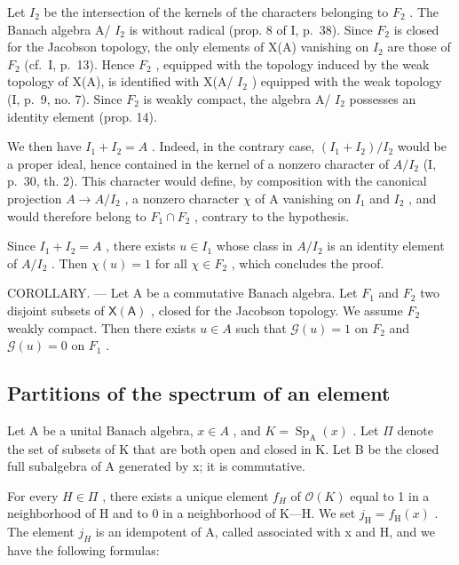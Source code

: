 Let \(I_{2}\) be the intersection of the kernels of the characters belonging to \(F_{2}\) . The Banach algebra A/ \(I_{2}\) is without radical (prop. 8 of I, p.~38). Since \(F_{2}\) is closed for the Jacobson topology, the only elements of X(A) vanishing on \(I_{2}\) are those of \(F_{2}\) (cf.~I, p.~13). Hence \(F_{2}\) , equipped with the topology induced by the weak topology of X(A), is identified with X(A/ \(I_{2}\) ) equipped with the weak topology (I, p.~9, no. 7). Since \(F_{2}\) is weakly compact, the algebra A/ \(I_{2}\) possesses an identity element (prop. 14).

We then have \(I_{1} + I_{2} = A\) . Indeed, in the contrary case, \((I_{1} + I_{2})/I_{2}\) would be a proper ideal, hence contained in the kernel of a nonzero character of \(A/I_{2}\) (I, p.~30, th. 2). This character would define, by composition with the canonical projection \(A \rightarrow A/I_{2}\) , a nonzero character \(\chi\) of A vanishing on \(I_{1}\) and \(I_{2}\) , and would therefore belong to \(F_{1} \cap F_{2}\) , contrary to the hypothesis.

Since \(I_{1} + I_{2} = A\) , there exists \(u \in I_{1}\) whose class in \(A/I_{2}\) is an identity element of \(A/I_{2}\) . Then \(\chi(u) = 1\) for all \(\chi \in F_{2}\) , which concludes the proof.

COROLLARY. --- Let A be a commutative Banach algebra. Let \(F_{1}\) and \(F_{2}\) two disjoint subsets of \(\mathsf{X}(\mathsf{A})\) , closed for the Jacobson topology. We assume \(F_{2}\) weakly compact. Then there exists \(u \in A\) such that \(\mathcal{G}(u) = 1\) on \(F_{2}\) and \(\mathcal{G}(u) = 0\) on \(F_{1}\) .

\subsection{Partitions of the spectrum of an element}

Let A be a unital Banach algebra, \(x \in A\) , and \(K = \operatorname{Sp}_{\mathrm{A}}(x)\) . Let \(\Pi\) denote the set of subsets of K that are both open and closed in K. Let B be the closed full subalgebra of A generated by x; it is commutative.

For every \(H \in \Pi\) , there exists a unique element \(f_{H}\) of \(\mathcal{O}(K)\) equal to 1 in a neighborhood of H and to 0 in a neighborhood of K---H. We set \(j_{\mathrm{H}} = f_{\mathrm{H}}(x)\) . The element \(j_{H}\) is an idempotent of A, called associated with x and H, and we have the following formulas:

